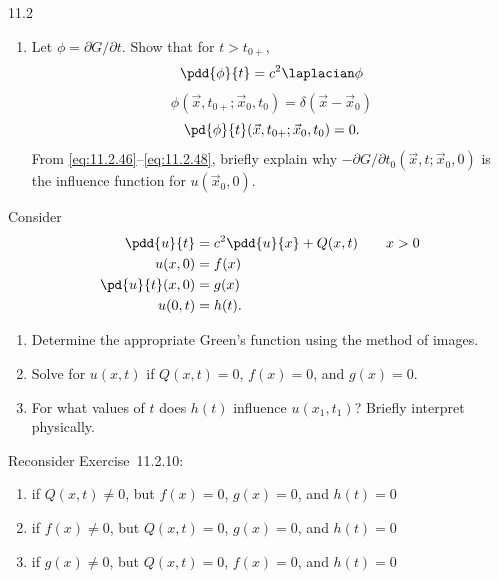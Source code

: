 \begin{exercises}{11.2}
\begin{enumerate}
\item[(b)] Let $\phi = \partial G/\partial t$.  Show that for $t > t_{0+}$,
\begin{equation}
\label{eq:11.2.46}
\pdd{\phi}{t} = c^2\laplacian \phi
\end{equation}
\begin{equation}
\label{eq:11.2.47}
\phi(\vec{x},t_{0+};\vec{x}_0,t_0) = \delta(\vec{x} - \vec{x}_0)
\end{equation}
\begin{equation}
\label{eq:11.2.48}
\pd{\phi}{t}(\vec{x},t_{0+};\vec{x}_0,t_0) = 0.
\end{equation}
From \eqref{eq:11.2.46}--\eqref{eq:11.2.48}, briefly explain why $-\partial G/\partial t_0(\vec{x},t;\vec{x}_0,0)$ is the influence function for $u(\vec{x}_0,0)$.
\end{enumerate}

\item \label{ex:11.2.10}
Consider
\begin{align*}
\pdd{u}{t} &= c^2\pdd{u}{x} + Q(x,t) \qquad x > 0 \\
u(x,0) &= f(x) \\
\pd{u}{t}(x,0) &= g(x) \\
u(0,t) &= h(t).
\end{align*}
\begin{enumerate}
\item[(a)] Determine the appropriate Green's function using the method of images.
\item[\starred (b)] Solve for $u(x,t)$ if $Q(x,t) = 0$, $f(x) = 0$, and $g(x) = 0$.
\item[(c)] For what values of $t$ does $h(t)$ influence $u(x_1,t_1)$?  Briefly interpret physically.
\end{enumerate}

\item \label{ex:11.2.11}
Reconsider Exercise~11.2.10:
\begin{enumerate}
\item[(a)] if $Q(x,t) \ne 0$, but $f(x) = 0$, $g(x) = 0$, and $h(t) = 0$
\item[(b)] if $f(x) \ne 0$, but $Q(x,t) = 0$, $g(x) = 0$, and $h(t) = 0$
\item[(c)] if $g(x) \ne 0$, but $Q(x,t) = 0$, $f(x) = 0$, and $h(t) = 0$
\end{enumerate}


\end{exercises}
